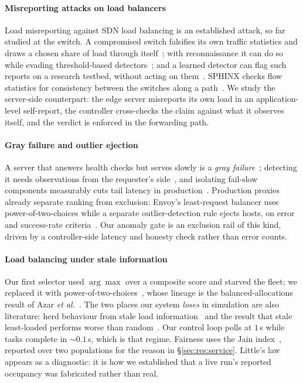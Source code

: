 \documentclass[10pt,twocolumn,letterpaper]{article}
\newcommand{\etal}{\textit{et al.}}
\begin{document}
\paragraph*{Misreporting attacks on load balancers}
Load misreporting against SDN load balancing is an established attack, so far
studied at the switch. A compromised switch falsifies its own traffic
statistics and draws a chosen share of load through itself~\cite{burke2023misreporting};
with reconnaissance it can do so while evading threshold-based
detectors~\cite{yu2024stealthy}; and a learned detector can flag such reports
on a research testbed, without acting on them~\cite{saha2025misreporting}.
SPHINX checks flow statistics for consistency between the switches along a
path~\cite{dhawan2015sphinx}. We study the server-side counterpart: the edge
server misreports its own load in an application-level self-report, the
controller cross-checks the claim against what it observes itself, and the
verdict is enforced in the forwarding path.

\paragraph*{Gray failure and outlier ejection}
A server that answers health checks but serves slowly is a \emph{gray
failure}~\cite{huang2017gray}; detecting it needs observations from the
requester's side~\cite{huang2018panorama}, and isolating fail-slow components
measurably cuts tail latency in production~\cite{lu2023perseus}. Production
proxies already separate ranking from exclusion: Envoy's least-request balancer
uses power-of-two-choices while a separate outlier-detection rule ejects hosts,
on error and success-rate criteria~\cite{envoy_outlier}. Our anomaly gate is an
exclusion rail of this kind, driven by a controller-side latency and honesty
check rather than error counts.

\paragraph*{Load balancing under stale information}
Our first selector used $\arg\max$ over a composite score and starved the
fleet; we replaced it with power-of-two-choices~\cite{mitzenmacher2001p2c},
whose lineage is the balanced-allocations result of Azar
\etal~\cite{azar1999balanced}. The two places our system \emph{loses} in
simulation are also literature: herd behaviour from stale load
information~\cite{mitzenmacher2000old} and the result that stale least-loaded
performs worse than random~\cite{dahlin2000stale}. Our control loop polls at
$1$\,s while tasks complete in ${\sim}0.1$\,s, which is that regime. Fairness
uses the Jain index~\cite{jain1984fairness}, reported over two populations for
the reason in \S\ref{sec:res:service}. Little's law~\cite{little1961} appears
as a diagnostic: it is how we established that a live run's reported occupancy
was fabricated rather than real.
\end{document}
